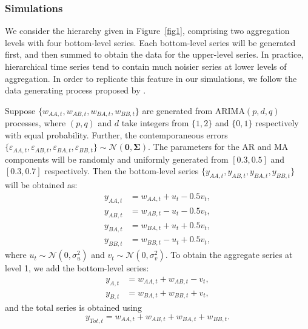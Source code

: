 \documentclass[a4paper, 11pt]{article}
\begin{document}
\subsubsection*{Simulations}

We consider the hierarchy given in Figure~\ref{fig1}, comprising two aggregation levels with four bottom-level series. Each bottom-level series will be generated first, and then summed to obtain the data for the upper-level series. In practice, hierarchical time series tend to contain much noisier series at lower levels of aggregation. In order to replicate this feature in our simulations, we follow the data generating process proposed by \citet{Wickramasuriya2017}.

Suppose $\{w_{AA,t},w_{AB,t},w_{BA,t},w_{BB,t}\}$ are generated from ARIMA$(p,d,q)$ processes, where $(p,q)$ and $d$ take integers from $\{1,2\}$ and $\{0,1\}$ respectively with equal probability. Further, the contemporaneous errors $\{\varepsilon_{AA,t},\varepsilon_{AB,t},\varepsilon_{BA,t},\varepsilon_{BB,t}\} \sim \mathcal{N}(\bm{0}, \bm{\Sigma})$. The parameters for the AR and MA components will be randomly and uniformly generated from $[0.3,0.5]$ and $[0.3,0.7]$ respectively. Then the bottom-level series $\{y_{AA,t},y_{AB,t},y_{BA,t},y_{BB,t}\}$ will be obtained as:
\begin{align*}
y_{AA,t} &= w_{AA,t} + u_t - 0.5v_t,\\
y_{AB,t} &= w_{AB,t} - u_t - 0.5v_t,\\
y_{BA,t} &= w_{BA,t} + u_t + 0.5v_t,\\
y_{BB,t} &= w_{BB,t} - u_t + 0.5v_t,
\end{align*}
where $u_t \sim \mathcal{N}(0,\sigma^2_u)$ and $v_t \sim \mathcal{N}(0,\sigma^2_v)$.
To obtain the aggregate series at level 1, we add the bottom-level series:
\begin{align*}
y_{A,t} &= w_{AA,t} + w_{AB,t} - v_t,\\
y_{B,t} &= w_{BA,t} + w_{BB,t} + v_t,
\end{align*}
and the total series is obtained using
$$y_{Tot,t} = w_{AA,t} + w_{AB,t} + w_{BA,t} + w_{BB,t}.$$
\end{document}

